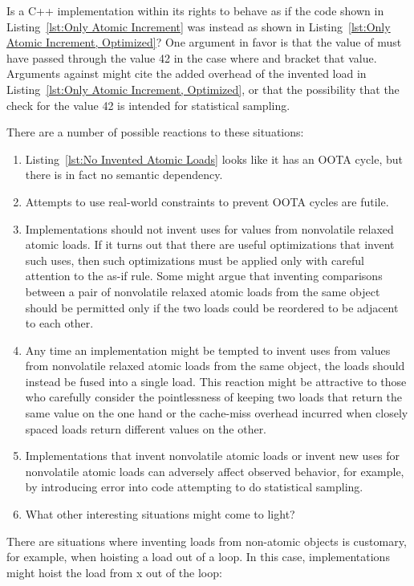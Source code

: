 \documentclass[10]{article}
\begin{document}
Is a C++ implementation within its rights to behave as if the code
shown in
Listing~\ref{lst:Only Atomic Increment}
was instead as shown in
Listing~\ref{lst:Only Atomic Increment, Optimized}?
One argument in favor is that the value of  must have
passed through the value 42 in the case where  and 
bracket that value.
Arguments against might cite the added overhead of the invented load
in Listing~\ref{lst:Only Atomic Increment, Optimized}, or that the
possibility that the check for the value 42 is intended for statistical
sampling.

There are a number of possible reactions to these situations:

\begin{enumerate}
\item	Listing~\ref{lst:No Invented Atomic Loads}
	looks like it has an OOTA cycle, but there is in fact no
	semantic dependency.
\item	Attempts to use real-world constraints to prevent OOTA cycles
	are futile.
\item	Implementations should not invent uses for values from
	nonvolatile relaxed atomic loads.
	If it turns out that there are useful optimizations that invent
	such uses, then such optimizations must be applied only with
	careful attention to the as-if rule.
	Some might argue that inventing comparisons between a pair of
	nonvolatile relaxed atomic loads from the same object should
	be permitted only if the two loads could be reordered to be
	adjacent to each other.
\item	Any time an implementation might be tempted to invent uses from
	values from nonvolatile relaxed atomic loads from the same
	object, the loads should instead be fused into a single load.
	This reaction might be attractive to those who carefully consider
	the pointlessness of keeping two loads that return the same value
	on the one hand or the cache-miss overhead incurred when closely
	spaced loads return different values on the other.
\item	Implementations that invent nonvolatile atomic loads or invent
	new uses for nonvolatile atomic loads can adversely affect
	observed behavior, for example, by introducing error into code
	attempting to do statistical sampling.
\item	What other interesting situations might come to light?
\end{enumerate}

There are situations where inventing loads from non-atomic objects
is customary, for example, when hoisting a load out of a loop.
In this case, implementations might hoist the load from x out of
the loop:
\end{document}
